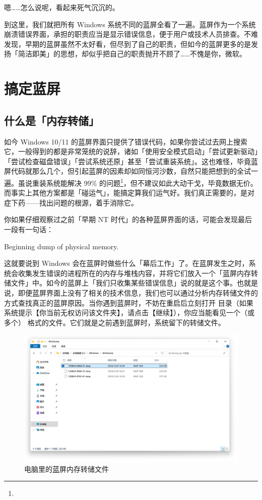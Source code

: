 嗯……怎么说呢，看起来死气沉沉的。

到这里，我们就把所有 Windows 系统不同的蓝屏全看了一遍。蓝屏作为一个系统崩溃错误界面，承担的职责应当是显示错误信息，便于用户或技术人员排查。不难发现，早期的蓝屏虽然不太好看，但尽到了自己的职责，但如今的蓝屏更多的是发扬「简洁即美」的思想，却似乎把自己的职责抛开不顾了……不愧是你，微软。

\section{搞定蓝屏}

\subsection{什么是「内存转储」}

如今 Windows 10/11 的蓝屏界面只提供了错误代码，如果你尝试过去网上搜索它，一般得到的都是非常笼统的说辞，诸如「使用安全模式启动」「尝试更新驱动」「尝试检查磁盘错误」「尝试系统还原」甚至「尝试重装系统」。这也难怪，毕竟蓝屏代码就那么几个，但引起蓝屏的因素却如同恒河沙数，自然只能把想到的全试一遍。虽说重装系统能解决 99\% 的问题\footnote{}，但不建议如此大动干戈，毕竟数据无价。而事实上其他方案都是「碰运气」，能搞定算我们运气好。我们真正需要的，是对症下药——找出问题的根源，着手消除它。

你如果仔细观察过之前「早期 NT 时代」的各种蓝屏界面的话，可能会发现最后一段有一句话：

\begin{quoting}
  Beginning dump of physical memory.
\end{quoting}

这就要说到 Windows 会在蓝屏时做些什么「幕后工作」了。在蓝屏发生之时，系统会收集发生错误的进程所在的内存与堆栈内容，并将它们放入一个「蓝屏内存转储文件」中。如今的蓝屏上「我们只收集某些错误信息」说的就是这个事。也就是说，即便蓝屏界面上没有了相关的技术信息，我们也可以通过分析内存转储文件的方式查找真正的蓝屏原因。当你遇到蓝屏时，不妨在重启后立刻打开  目录（如果系统提示【你当前无权访问该文件夹】，请点击【继续】），你应当能看见一个（或多个） 格式的文件。它们就是之前遇到蓝屏时，系统留下的转储文件。

\begin{figure}[htb!]
  \centering
  \includegraphics[width=.75\textwidth]{assets/advanced/Dump_files.png}
  \caption{电脑里的蓝屏内存转储文件}
  \label{fig:Dump_files}
\end{figure}

